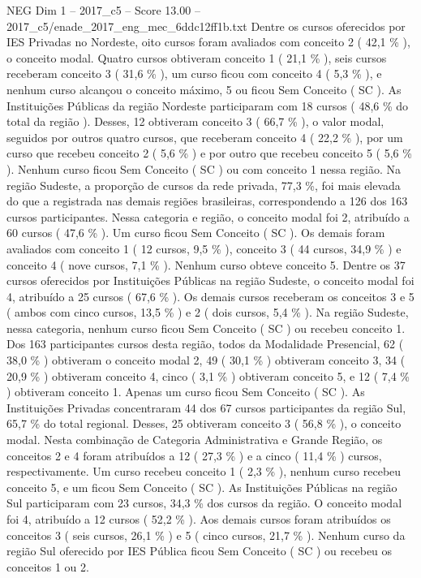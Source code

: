 \begin{textsample}{NEG Dim 1 – 2017\_c5 – Score 13.00 – 2017\_c5/enade\_2017\_eng\_mec\_6ddc12ff1b.txt}
Dentre os cursos oferecidos por IES Privadas no Nordeste, oito cursos foram avaliados com conceito 2 ( 42,1 \% ), o conceito modal.
Quatro cursos obtiveram conceito 1 ( 21,1 \% ), seis cursos receberam conceito 3 ( 31,6 \% ), um curso ficou com conceito 4 ( 5,3 \% ), e nenhum curso alcançou o conceito máximo, 5 ou ficou Sem Conceito ( SC ).
As Instituições Públicas da região Nordeste participaram com 18 cursos ( 48,6 \% do total da região ).
Desses, 12 obtiveram conceito 3 ( 66,7 \% ), o valor modal, seguidos por outros quatro cursos, que receberam conceito 4 ( 22,2 \% ), por um curso que recebeu conceito 2 ( 5,6 \% ) e por outro que recebeu conceito 5 ( 5,6 \% ).
Nenhum curso ficou Sem Conceito ( SC ) ou com conceito 1 nessa região.
Na região Sudeste, a proporção de cursos da rede privada, 77,3 \%, foi mais elevada do que a registrada nas demais regiões brasileiras, correspondendo a 126 dos 163 cursos participantes.
Nessa categoria e região, o conceito modal foi 2, atribuído a 60 cursos ( 47,6 \% ).
Um curso ficou Sem Conceito ( SC ).
Os demais foram avaliados com conceito 1 ( 12 cursos, 9,5 \% ), conceito 3 ( 44 cursos, 34,9 \% ) e conceito 4 ( nove cursos, 7,1 \% ).
Nenhum curso obteve conceito 5.
Dentre os 37 cursos oferecidos por Instituições Públicas na região Sudeste, o conceito modal foi 4, atribuído a 25 cursos ( 67,6 \% ).
Os demais cursos receberam os conceitos 3 e 5 ( ambos com cinco cursos, 13,5 \% ) e 2 ( dois cursos, 5,4 \% ).
Na região Sudeste, nessa categoria, nenhum curso ficou Sem Conceito ( SC ) ou recebeu conceito 1.
Dos 163 participantes cursos desta região, todos da Modalidade Presencial, 62 ( 38,0 \% ) obtiveram o conceito modal 2, 49 ( 30,1 \% ) obtiveram conceito 3, 34 ( 20,9 \% ) obtiveram conceito 4, cinco ( 3,1 \% ) obtiveram conceito 5, e 12 ( 7,4 \% ) obtiveram conceito 1.
Apenas um curso ficou Sem Conceito ( SC ).
As Instituições Privadas concentraram 44 dos 67 cursos participantes da região Sul, 65,7 \% do total regional.
Desses, 25 obtiveram conceito 3 ( 56,8 \% ), o conceito modal.
Nesta combinação de Categoria Administrativa e Grande Região, os conceitos 2 e 4 foram atribuídos a 12 ( 27,3 \% ) e a cinco ( 11,4 \% ) cursos, respectivamente.
Um curso recebeu conceito 1 ( 2,3 \% ), nenhum curso recebeu conceito 5, e um ficou Sem Conceito ( SC ).
As Instituições Públicas na região Sul participaram com 23 cursos, 34,3 \% dos cursos da região.
O conceito modal foi 4, atribuído a 12 cursos ( 52,2 \% ).
Aos demais cursos foram atribuídos os conceitos 3 ( seis cursos, 26,1 \% ) e 5 ( cinco cursos, 21,7 \% ).
Nenhum curso da região Sul oferecido por IES Pública ficou Sem Conceito ( SC ) ou recebeu os conceitos 1 ou 2.

\end{textsample}
